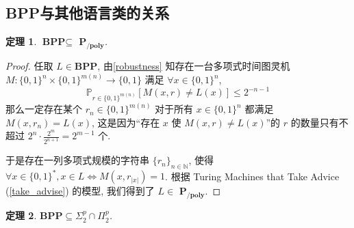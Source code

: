 \documentclass[8pt]{article}
\theoremstyle{compact}
\newtheorem{theorem}{定理}[section]
\def\le{\leqslant}
\def\PPOLY{$\textbf{P}_{\textbf{/poly}}$}
\def\BPP{\textbf{BPP}}
\begin{document}
\subsection{\BPP 与其他语言类的关系}
\begin{theorem}
	$\BPP \subseteq $ \PPOLY.
\end{theorem}
\begin{proof}
	任取 $L \in \BPP$, 由\cref{robustness} 知存在一台多项式时间图灵机 $M: \{0, 1\}^n \times \{0, 1\}^{m(n)} \to \{0, 1\}$ 满足 $\forall x \in \{0, 1\}^n$, $$\mathbb P_{r \in \{0, 1\}^{m(n)}}[M(x, r) \neq L(x)] \le 2^{-n-1}$$ 那么一定存在某个 $r_n \in \{0, 1\}^{m(n)}$ 对于所有 $x \in \{0, 1\}^n$ 都满足 $M(x, r_n) = L(x)$, 这是因为“存在 $x$ 使 $M(x, r) \neq L(x)$”的 $r$ 的数量只有不超过 $2^n \cdot \frac{2^m}{2^{n+1}} = 2^{m-1}$ 个.

	于是存在一列多项式规模的字符串 $\{r_n\}_{n \in \mathbb N}$, 使得 $\forall x \in \{0, 1\}^*, x \in L \Leftrightarrow M(x, r_{|x|}) = 1$. 根据 Turing Machines that Take Advice (\cref{take_advise}) 的模型, 我们得到了 $L \in $ \PPOLY.
\end{proof}
\begin{theorem}
	$\BPP \subseteq \Sigma_2^p \cap \Pi_2^p$.
\end{theorem}
\end{document}
